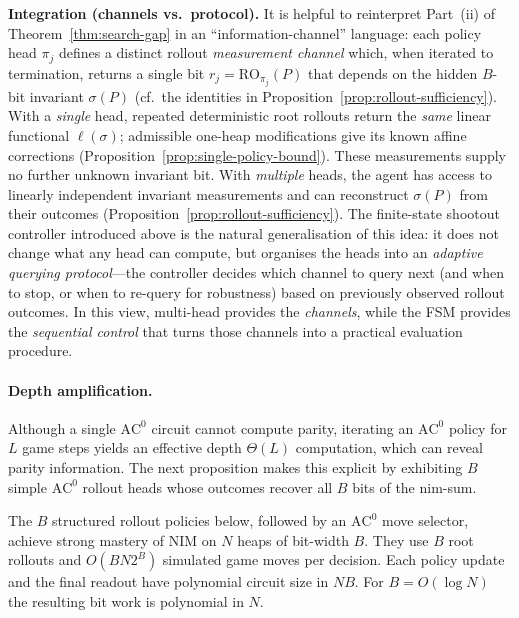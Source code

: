 \documentclass[twoside,11pt]{article}
\newcommand{\AC}{\mathrm{AC}}
\numberwithin{theorem}{section}
\numberwithin{equation}{section}
\begin{document}
\noindent\textbf{Integration (channels vs.\ protocol).}
It is helpful to reinterpret Part~(ii) of Theorem~\ref{thm:search-gap} in an ``information-channel'' language: each policy head $\pi_j$ defines a distinct rollout \emph{measurement channel} which, when iterated to termination, returns a single bit $r_j=\mathrm{RO}_{\pi_j}(P)$ that depends on the hidden $B$-bit invariant $\sigma(P)$ (cf.\ the identities in Proposition~\ref{prop:rollout-sufficiency}).
With a \emph{single} head, repeated deterministic root rollouts return the \emph{same} linear functional $\ell(\sigma)$; admissible one-heap modifications give its known affine corrections (Proposition~\ref{prop:single-policy-bound}). These measurements supply no further unknown invariant bit.
With \emph{multiple} heads, the agent has access to linearly independent invariant measurements and can reconstruct $\sigma(P)$ from their outcomes (Proposition~\ref{prop:rollout-sufficiency}).
The finite-state shootout controller introduced above is the natural generalisation of this idea: it does not change what any head can compute, but organises the heads into an \emph{adaptive querying protocol}---the controller decides which channel to query next (and when to stop, or when to re-query for robustness) based on previously observed rollout outcomes.
In this view, multi-head provides the \emph{channels}, while the FSM provides the \emph{sequential control} that turns those channels into a practical evaluation procedure.

\paragraph{Depth amplification.}
Although a single $\AC^0$ circuit cannot compute parity, iterating an $\AC^0$ policy for $L$ game steps yields an effective depth $\Theta(L)$ computation, which can reveal parity information.
The next proposition makes this explicit by exhibiting $B$ simple $\AC^0$ rollout heads whose outcomes recover all $B$ bits of the nim-sum.

\begin{proposition}
\label{prop:rollout-sufficiency}
The $B$ structured rollout policies below, followed by an $\AC^0$ move selector, achieve strong mastery of NIM on $N$ heaps of bit-width $B$. They use $B$ root rollouts and $O(BN2^B)$ simulated game moves per decision. Each policy update and the final readout have polynomial circuit size in $NB$. For $B=O(\log N)$ the resulting bit work is polynomial in $N$.
\end{proposition}
\end{document}
